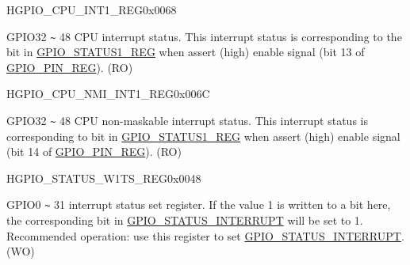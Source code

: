 \begin{register}{H}{GPIO\_CPU\_INT1\_REG}{0x{}0068}\label{regdesc:GPIOPCPUINT1REG}
%
%
\regnewline%
\begin{regdesc}\begin{reglist}
\label{fielddesc:GPIOPROCPU1INT}\item [GPIO\_CPU1\_INT] GPIO32 \verb+~+ 48 CPU interrupt status. This interrupt status is corresponding to the bit in \hyperref[regdesc:GPIOSTATUS1REG]{GPIO\_STATUS1\_REG} when assert (high) enable signal (bit 13 of \hyperref[regdesc:GPIOPINNREG]{GPIO\_PIN\_REG}). (RO)
\end{reglist}\end{regdesc}
\end{register}


\begin{register}{H}{GPIO\_CPU\_NMI\_INT1\_REG}{0x{}006C}\label{regdesc:GPIOPCPUNMIINT1REG}
%
%
\regnewline%
\begin{regdesc}\begin{reglist}
\label{fielddesc:GPIOPROCPUNMI1INT}\item [GPIO\_CPU\_NMI1\_INT] GPIO32 \verb+~+ 48 CPU non-maskable interrupt status. This interrupt status is corresponding to bit in \hyperref[regdesc:GPIOSTATUS1REG]{GPIO\_STATUS1\_REG} when assert (high) enable signal (bit 14 of \hyperref[regdesc:GPIOPINNREG]{GPIO\_PIN\_REG}). (RO)
\end{reglist}\end{regdesc}
\end{register}


\begin{register}{H}{GPIO\_STATUS\_W1TS\_REG}{0x{}0048}\label{regdesc:GPIOSTATUSW1TSREG}
%
\regnewline%
\begin{regdesc}\begin{reglist}
\label{fielddesc:GPIOSTATUSW1TS}\item [GPIO\_STATUS\_W1TS] GPIO0 \verb+~+ 31 interrupt status set register. If the value 1 is written to a bit here, the corresponding bit in \hyperref[fielddesc:GPIOSTATUSINTERRUPT]{GPIO\_STATUS\_INTERRUPT} will be set to 1. Recommended operation: use this register to set \hyperref[fielddesc:GPIOSTATUSINTERRUPT]{GPIO\_STATUS\_INTERRUPT}. (WO)
\end{reglist}\end{regdesc}
\end{register}


